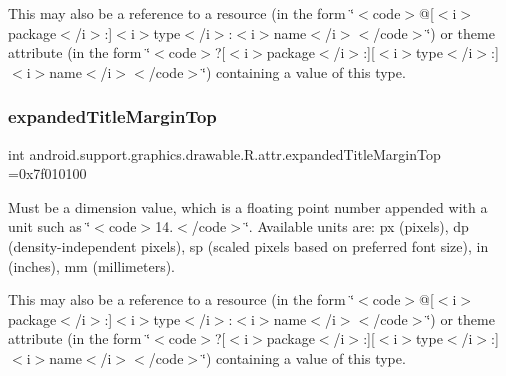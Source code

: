 This may also be a reference to a resource (in the form \char`\"{}$<$code$>$@\mbox{[}$<$i$>$package$<$/i$>$\+:\mbox{]}$<$i$>$type$<$/i$>$\+:$<$i$>$name$<$/i$>$$<$/code$>$\char`\"{}) or theme attribute (in the form \char`\"{}$<$code$>$?\mbox{[}$<$i$>$package$<$/i$>$\+:\mbox{]}\mbox{[}$<$i$>$type$<$/i$>$\+:\mbox{]}$<$i$>$name$<$/i$>$$<$/code$>$\char`\"{}) containing a value of this type. \mbox{\label{classandroid_1_1support_1_1graphics_1_1drawable_1_1R_1_1attr_aa8ebc42935a8b920de21fdac8e90f706}} 
\subsubsection{\texorpdfstring{expanded\+Title\+Margin\+Top}{expandedTitleMarginTop}}
{\footnotesize\ttfamily int android.\+support.\+graphics.\+drawable.\+R.\+attr.\+expanded\+Title\+Margin\+Top =0x7f010100\hspace{0.3cm}{\ttfamily [static]}}

Must be a dimension value, which is a floating point number appended with a unit such as \char`\"{}$<$code$>$14.\+5sp$<$/code$>$\char`\"{}. Available units are\+: px (pixels), dp (density-\/independent pixels), sp (scaled pixels based on preferred font size), in (inches), mm (millimeters). 

This may also be a reference to a resource (in the form \char`\"{}$<$code$>$@\mbox{[}$<$i$>$package$<$/i$>$\+:\mbox{]}$<$i$>$type$<$/i$>$\+:$<$i$>$name$<$/i$>$$<$/code$>$\char`\"{}) or theme attribute (in the form \char`\"{}$<$code$>$?\mbox{[}$<$i$>$package$<$/i$>$\+:\mbox{]}\mbox{[}$<$i$>$type$<$/i$>$\+:\mbox{]}$<$i$>$name$<$/i$>$$<$/code$>$\char`\"{}) containing a value of this type. \mbox{\label{classandroid_1_1support_1_1graphics_1_1drawable_1_1R_1_1attr_a5bc73a60706985226bdafe5f9ba2d715}} 
